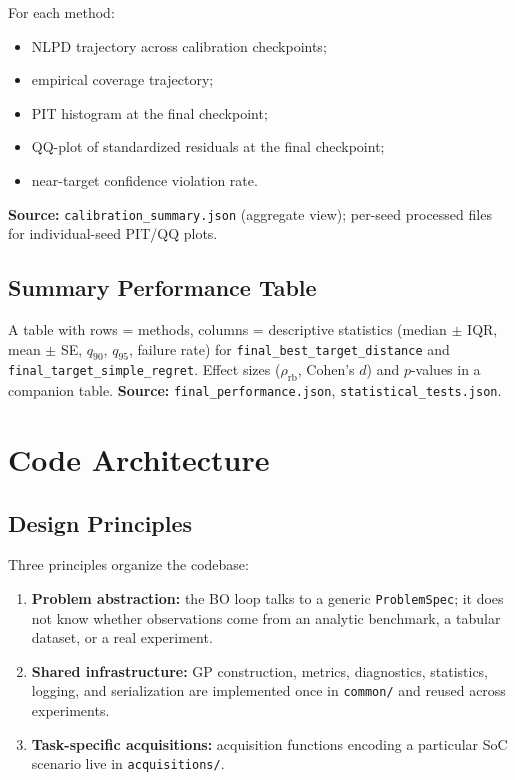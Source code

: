 \documentclass[11pt]{article}
\begin{document}
For each method:
\begin{itemize}
  \item NLPD trajectory across calibration checkpoints;
  \item empirical coverage trajectory;
  \item PIT histogram at the final checkpoint;
  \item QQ-plot of standardized residuals at the final checkpoint;
  \item near-target confidence violation rate.
\end{itemize}
\textbf{Source:} \texttt{calibration\_summary.json} (aggregate view);
per-seed processed files for individual-seed PIT/QQ plots.
 
\subsection{Summary Performance Table}
 
A table with rows = methods, columns = descriptive statistics
(median $\pm$ IQR, mean $\pm$ SE, $q_{90}$, $q_{95}$, failure rate) for
\texttt{final\_best\_target\_distance} and \texttt{final\_target\_simple\_regret}.
Effect sizes ($\rho_{\mathrm{rb}}$, Cohen's $d$) and $p$-values in a companion table.
\textbf{Source:} \texttt{final\_performance.json}, \texttt{statistical\_tests.json}.
 
\section{Code Architecture}
\label{sec:code}
 
\subsection{Design Principles}
 
Three principles organize the codebase:
\begin{enumerate}
  \item \textbf{Problem abstraction:} the BO loop talks to a generic
        \texttt{ProblemSpec}; it does not know whether observations come from an
        analytic benchmark, a tabular dataset, or a real experiment.
  \item \textbf{Shared infrastructure:} GP construction, metrics, diagnostics,
        statistics, logging, and serialization are implemented once in \texttt{common/}
        and reused across experiments.
  \item \textbf{Task-specific acquisitions:} acquisition functions encoding a particular
        SoC scenario live in \texttt{acquisitions/}.
\end{enumerate}
 
\end{document}
